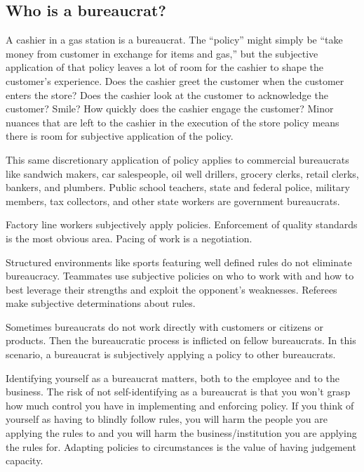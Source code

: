 \subsection{Who is a bureaucrat?}

A cashier in a gas station is a bureaucrat. The ``policy'' might simply be ``take money from customer in exchange for items and gas,'' but the subjective application of that policy leaves a lot of room for the cashier to shape the customer's experience. Does the cashier greet the customer when the customer enters the store? Does the cashier look at the customer to acknowledge the customer? Smile? How quickly does the cashier engage the customer? Minor nuances that are left to the cashier in the execution of the store policy means there is room for subjective application of the policy. 

This same discretionary application of policy applies to commercial bureaucrats like sandwich makers, car salespeople, oil well drillers, grocery clerks, retail clerks, bankers, and plumbers. Public school teachers, state and federal police, military members, tax collectors, and other state workers are government bureaucrats. 

Factory line workers subjectively apply policies. Enforcement of quality standards is the most obvious area. Pacing of work is a negotiation.

Structured environments like sports featuring well defined rules do not eliminate bureaucracy. Teammates use subjective policies on who to work with and how to best leverage their strengths and exploit the opponent's weaknesses. Referees make subjective determinations about rules.

Sometimes bureaucrats do not work directly with customers or citizens or products. Then the bureaucratic process is inflicted on fellow bureaucrats. In this scenario, a bureaucrat is subjectively applying a policy to other bureaucrats. 

Identifying yourself as a bureaucrat matters, both to the employee and to the business. The risk of not self-identifying as a bureaucrat is that you won't grasp how much control you have in implementing and enforcing policy. If you think of yourself as having to blindly follow rules, you will harm the people you are applying the rules to and you will harm the business/institution you are applying the rules for. Adapting policies to circumstances is the value of having judgement capacity. 

